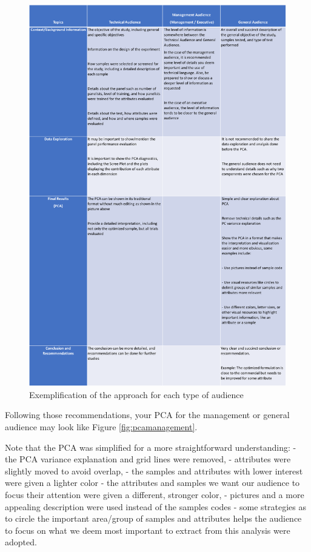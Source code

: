 \documentclass[
]{krantz}
\begin{document}
\begin{figure}

{\centering \includegraphics[width=1\linewidth]{images/table_value_delivery_2} 

}

\caption{Exemplification of the approach for each type of audience}\label{fig:summarytable1}
\end{figure}

Following those recommendations, your PCA for the management or general audience may look like Figure \ref{fig:pcamanagement}.

Note that the PCA was simplified for a more straightforward understanding:
- the PCA variance explanation and grid lines were removed,
- attributes were slightly moved to avoid overlap,
- the samples and attributes with lower interest were given a lighter color
- the attributes and samples we want our audience to focus their attention were given a different, stronger color,
- pictures and a more appealing description were used instead of the samples codes
- some strategies as to circle the important area/group of samples and attributes helps the audience to focus on what we deem most important to extract from this analysis were adopted.
\end{document}
